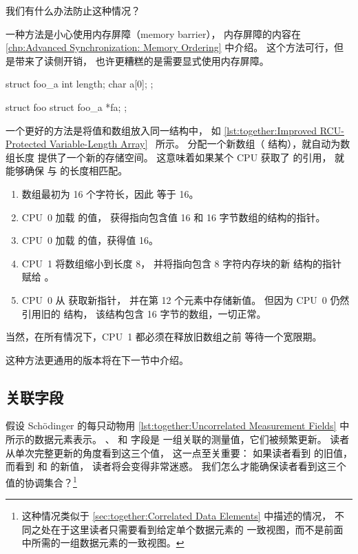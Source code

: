 我们有什么办法防止这种情况？

一种方法是小心使用内存屏障（memory barrier），
内存屏障的内容在 \cref{chp:Advanced Synchronization: Memory Ordering} 中介绍。
这个方法可行，但是带来了读侧开销，
也许更糟糕的是需要显式使用内存屏障。

\begin{listing}
\begin{VerbatimL}[tabsize=8]
struct foo_a {
	int length;
	char a[0];
};

struct foo {
	struct foo_a *fa;
};
\end{VerbatimL}
\caption{改进的 RCU 保护的可变长度数组}
\label{lst:together:Improved RCU-Protected Variable-Length Array}
\end{listing}

一个更好的方法是将值和数组放入同一结构中，
如 \cref{lst:together:Improved RCU-Protected Variable-Length Array}~\cite{Arcangeli03}
所示。
分配一个新数组（ 结构），就自动为数组长度
提供了一个新的存储空间。
这意味着如果某个 CPU 获取了  的引用，
就能够确保  与  的长度相匹配。

\begin{enumerate}
\item	数组最初为 16 个字符长，因此  等于 16。
\item	CPU~0 加载  的值，
	获得指向包含值 16 和 16 字节数组的结构的指针。
\item	CPU~0 加载  的值，获得值 16。
\item	CPU~1 将数组缩小到长度 8，
	并将指向包含 8 字符内存块的新  结构的指针
	赋给 。
\item	CPU~0 从  获取新指针，
	并在第 12 个元素中存储新值。
	但因为 CPU~0 仍然引用旧的  结构，
	该结构包含 16 字节的数组，一切正常。
\end{enumerate}

当然，在所有情况下，CPU~1 都必须在释放旧数组之前
等待一个宽限期。

这种方法更通用的版本将在下一节中介绍。

\subsection{关联字段}
\label{sec:together:Correlated Fields}

假设 Sch\"odinger 的每只动物用
\cref{lst:together:Uncorrelated Measurement Fields}
中所示的数据元素表示。
、 和  字段是
一组关联的测量值，它们被频繁更新。
读者从单次完整更新的角度看到这三个值，
这一点至关重要：
如果读者看到  的旧值，
而看到  和  的新值，
读者将会变得非常迷惑。
我们怎么才能确保读者看到这三个值的协调集合？\footnote{
	这种情况类似于
	\cref{sec:together:Correlated Data Elements}
	中描述的情况，
	不同之处在于这里读者只需要看到给定单个数据元素的
	一致视图，而不是前面
	中所需的一组数据元素的一致视图。}

